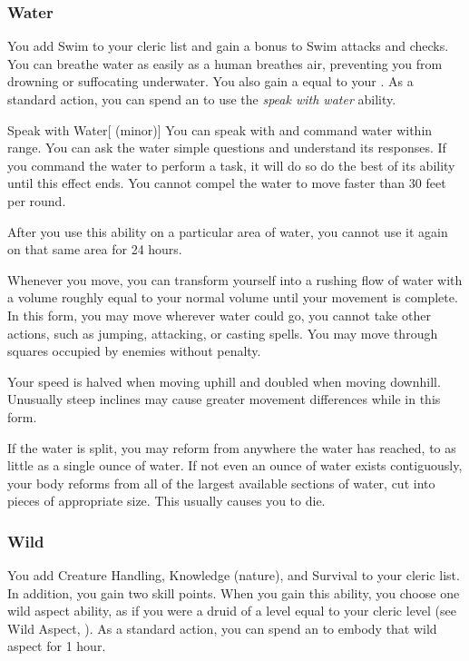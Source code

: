         \subsubsection{Water}
             You add Swim to your cleric  list and gain a  bonus to Swim attacks and checks.
             You can breathe water as easily as a human breathes air, preventing you from drowning or suffocating underwater.
            You also gain a  equal to your .
             As a standard action, you can spend an  to use the \textit{speak with water} ability.
            \begin{ability}{Speak with Water}[ (minor)]
                You can speak with and command water within range.
                You can ask the water simple questions and understand its responses.
                If you command the water to perform a task, it will do so do the best of its ability until this effect ends.
                You cannot compel the water to move faster than 30 feet per round.

                After you use this ability on a particular area of water, you cannot use it again on that same area for 24 hours.
            \end{ability}
            Whenever you move, you can transform yourself into a rushing flow of water with a volume roughly equal to your normal volume until your movement is complete.
            In this form, you may move wherever water could go, you cannot take other actions, such as jumping, attacking, or casting spells.
            You may move through squares occupied by enemies without penalty.
            \par Your speed is halved when moving uphill and doubled when moving downhill.
            Unusually steep inclines may cause greater movement differences while in this form.
            \par If the water is split, you may reform from anywhere the water has reached, to as little as a single ounce of water.
            If not even an ounce of water exists contiguously, your body reforms from all of the largest available sections of water, cut into pieces of appropriate size.
            This usually causes you to die.

        \subsubsection{Wild}
             You add Creature Handling, Knowledge (nature), and Survival to your cleric  list.
            In addition, you gain two skill points.
             When you gain this ability, you choose one wild aspect ability, as if you were a druid of a level equal to your cleric level (see Wild Aspect, ).
            As a standard action, you can spend an  to embody that wild aspect for 1 hour.

